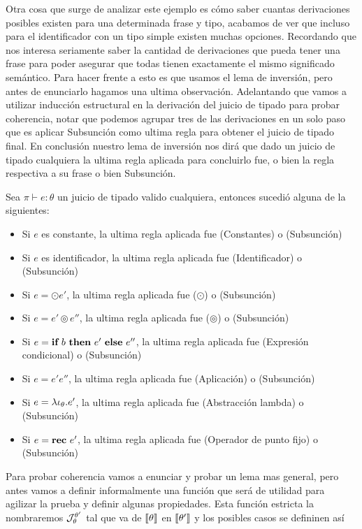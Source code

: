 Otra cosa que surge de analizar este ejemplo es c\'omo saber cuantas derivaciones
posibles existen para una determinada frase y tipo, acabamos de ver que
incluso para el identificador con un tipo simple existen muchas opciones.
Recordando que nos interesa seriamente saber la cantidad de derivaciones 
que pueda tener una frase para poder asegurar que todas tienen exactamente
el mismo significado sem\'antico. Para hacer frente a esto es que usamos 
el lema de inversi\'on, pero antes de enunciarlo hagamos una ultima observaci\'on.
Adelantando que vamos a utilizar inducci\'on estructural en la derivaci\'on
del juicio de tipado para probar coherencia, notar que podemos agrupar
tres de las derivaciones en un solo paso que es aplicar 
Subsunción como ultima regla para obtener el juicio de tipado final. En
conclusi\'on nuestro lema de inversi\'on nos dir\'a que dado un juicio de 
tipado cualquiera la ultima regla aplicada para concluirlo fue, o bien
la regla respectiva a su frase o bien Subsunción.

\begin{lemma}[De inversi\'on]
Sea $\pi \vdash e : \theta$ un juicio de tipado valido cualquiera, entonces
sucedi\'o alguna de la siguientes:

\begin{itemize}
\item Si $e$ es constante, la ultima regla aplicada fue (Constantes) o (Subsunción)
\item Si $e$ es identificador, la ultima regla aplicada fue (Identificador) o (Subsunción)
\item Si $e = \odot e'$, la ultima regla aplicada fue ($\odot$) o (Subsunción)
\item Si $e = e' \circledcirc e''$, la ultima regla aplicada fue 
($\circledcirc$) o (Subsunción)
\item Si $e = \textbf{if} \ b \ \textbf{then} \ e' \ \textbf{else} \ e''$, la ultima regla aplicada fue 
(Expresi\'on condicional) o (Subsunción)
\item Si $e = e'e''$, la ultima regla aplicada fue (Aplicaci\'on) o (Subsunción)
\item Si $e = \lambda \iota_{\theta} . e'$, la ultima regla aplicada fue 
(Abstracci\'on lambda) o (Subsunción)
\item Si $e = \textbf{rec} \ e'$, la ultima regla aplicada fue (Operador de punto fijo) o (Subsunción)
\end{itemize}

\end{lemma}

Para probar coherencia vamos a enunciar y probar un lema mas general,
pero antes vamos a definir informalmente una 
funci\'on que ser\'a de utilidad para agilizar la prueba y definir algunas
propiedades. Esta funci\'on estricta la nombraremos $\mathcal{J}_{\theta}^{\theta'}$ tal que
va de $\llbracket \theta \rrbracket$ en $\llbracket \theta' \rrbracket$ y los posibles casos se defininen as\'i\\

